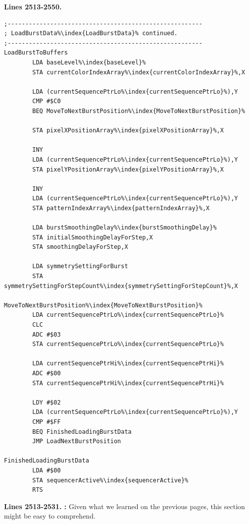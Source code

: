 \clearpage
\textbf{Lines 2513-2550. }
\begin{lstlisting}[escapechar=\%]
;-------------------------------------------------------
; LoadBurstData%\index{LoadBurstData}% continued.
;-------------------------------------------------------
LoadBurstToBuffers
        LDA baseLevel%\index{baseLevel}%
        STA currentColorIndexArray%\index{currentColorIndexArray}%,X

        LDA (currentSequencePtrLo%\index{currentSequencePtrLo}%),Y
        CMP #$C0
        BEQ MoveToNextBurstPosition%\index{MoveToNextBurstPosition}%

        STA pixelXPositionArray%\index{pixelXPositionArray}%,X

        INY 
        LDA (currentSequencePtrLo%\index{currentSequencePtrLo}%),Y
        STA pixelYPositionArray%\index{pixelYPositionArray}%,X

        INY 
        LDA (currentSequencePtrLo%\index{currentSequencePtrLo}%),Y
        STA patternIndexArray%\index{patternIndexArray}%,X

        LDA burstSmoothingDelay%\index{burstSmoothingDelay}%
        STA initialSmoothingDelayForStep,X
        STA smoothingDelayForStep,X

        LDA symmetrySettingForBurst
        STA symmetrySettingForStepCount%\index{symmetrySettingForStepCount}%,X

MoveToNextBurstPosition%\index{MoveToNextBurstPosition}%
        LDA currentSequencePtrLo%\index{currentSequencePtrLo}%
        CLC 
        ADC #$03
        STA currentSequencePtrLo%\index{currentSequencePtrLo}%

        LDA currentSequencePtrHi%\index{currentSequencePtrHi}%
        ADC #$00
        STA currentSequencePtrHi%\index{currentSequencePtrHi}%

        LDY #$02
        LDA (currentSequencePtrLo%\index{currentSequencePtrLo}%),Y
        CMP #$FF
        BEQ FinishedLoadingBurstData
        JMP LoadNextBurstPosition

FinishedLoadingBurstData
        LDA #$00
        STA sequencerActive%\index{sequencerActive}%
        RTS 
\end{lstlisting}
\clearpage

\textbf{Lines 2513-2531. :}  Given what we learned on the previous pages, this section might be easy to comprehend.

